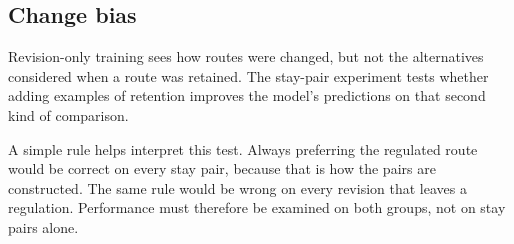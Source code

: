\documentclass[a4paper,conference]{IEEEtran}
\begin{document}
\subsection{Change bias}
\label{sec:changebias}
\label{sec:ablation-sec}


Revision-only training sees how routes were changed, but not the
alternatives considered when a route was retained. The stay-pair
experiment tests whether adding examples of retention improves the
model's predictions on that second kind of comparison.

A simple rule helps interpret this test. Always preferring the regulated
route would be correct on every stay pair, because that is how the pairs
are constructed. The same rule would be wrong on every revision that
leaves a regulation. Performance must therefore be examined on both
groups, not on stay pairs alone.
\end{document}
